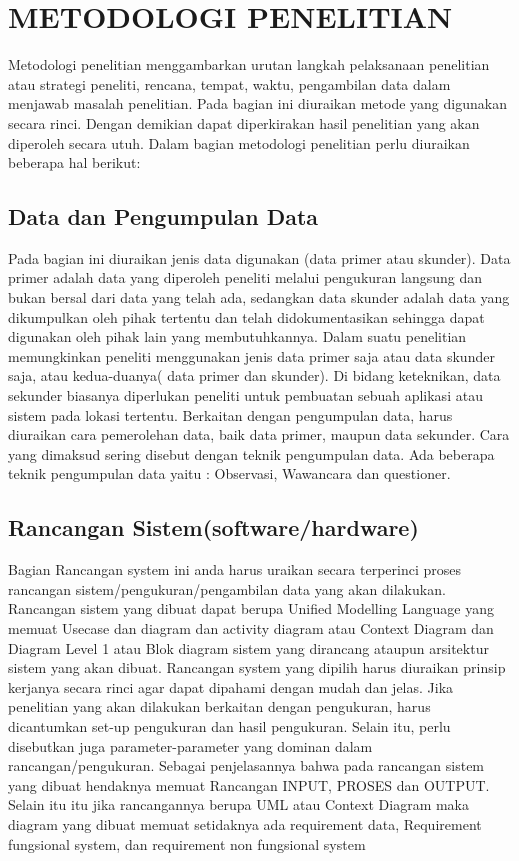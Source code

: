 \chapter{METODOLOGI PENELITIAN}
Metodologi penelitian menggambarkan urutan langkah pelaksanaan penelitian atau strategi peneliti, rencana, tempat, waktu, pengambilan data dalam menjawab masalah penelitian. Pada bagian ini diuraikan metode yang digunakan secara rinci. Dengan demikian dapat diperkirakan hasil penelitian yang akan diperoleh secara utuh. Dalam bagian metodologi penelitian perlu diuraikan beberapa hal berikut:

\section{Data dan Pengumpulan Data}
Pada bagian ini diuraikan jenis data digunakan  (data primer atau skunder). Data primer adalah data yang diperoleh  peneliti melalui pengukuran langsung dan bukan bersal dari data yang telah ada, sedangkan data skunder adalah data yang dikumpulkan oleh pihak tertentu dan telah didokumentasikan sehingga dapat digunakan oleh pihak lain yang membutuhkannya. Dalam suatu penelitian  memungkinkan peneliti menggunakan  jenis  data primer saja atau  data skunder saja, atau kedua-duanya( data primer dan skunder).  Di bidang keteknikan, data sekunder biasanya diperlukan peneliti untuk pembuatan sebuah aplikasi atau sistem pada lokasi tertentu. Berkaitan dengan pengumpulan data, harus diuraikan cara pemerolehan data, baik data primer, maupun data sekunder. Cara yang dimaksud sering disebut dengan teknik pengumpulan data. Ada beberapa teknik pengumpulan data yaitu : Observasi, Wawancara dan questioner.

\section{Rancangan Sistem(software/hardware)}
Bagian Rancangan system ini anda harus uraikan secara terperinci  proses rancangan   sistem/pengukuran/pengambilan data yang akan dilakukan. Rancangan sistem yang dibuat dapat berupa Unified Modelling Language yang memuat Usecase dan diagram dan activity diagram atau Context Diagram dan Diagram Level 1 atau  Blok diagram sistem yang dirancang ataupun arsitektur sistem yang akan dibuat. Rancangan system yang dipilih harus diuraikan prinsip kerjanya secara rinci agar dapat dipahami dengan mudah dan jelas. Jika penelitian yang akan dilakukan  berkaitan dengan pengukuran, harus dicantumkan set-up pengukuran dan hasil pengukuran. Selain itu, perlu disebutkan juga parameter-parameter yang dominan dalam rancangan/pengukuran.
Sebagai penjelasannya bahwa pada rancangan sistem yang dibuat hendaknya memuat Rancangan INPUT, PROSES dan OUTPUT. 
Selain itu itu jika rancangannya berupa UML atau Context Diagram maka diagram yang dibuat memuat setidaknya ada requirement data, Requirement fungsional system, dan requirement non fungsional system

